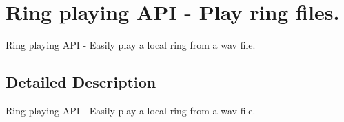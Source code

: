 \section{Ring playing API -\/ Play ring files.}
\label{group__ring__api}


Ring playing API -\/ Easily play a local ring from a wav file.  


\subsection{Detailed Description}
Ring playing API -\/ Easily play a local ring from a wav file. 
